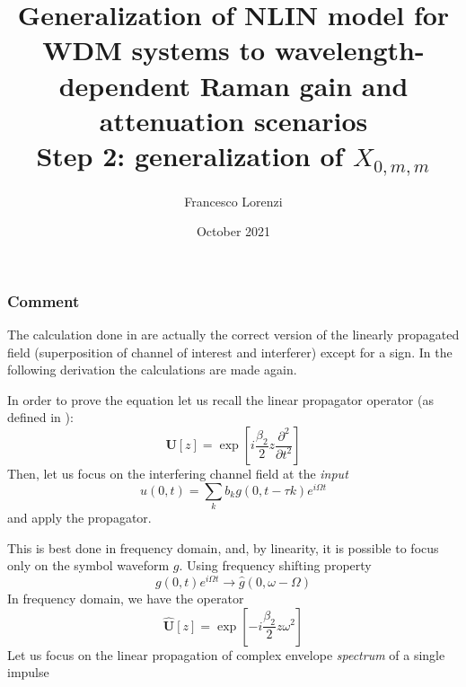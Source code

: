 \documentclass[8pt]{beamer} %
\title{Generalization of NLIN model for WDM systems to wavelength-dependent Raman gain and attenuation scenarios \\ \vspace{10pt} \small{Step 2: generalization of $X_{0, m, m}$}}
\author{Francesco Lorenzi}
\date{October 2021}
\institute[Università degli studi di Padova \\ Dipartimento di ingegneria dell'informazione]{}
\begin{document}
\expandafter\def\expandafter\insertshorttitle\expandafter{%
  \insertshorttitle\hfill%
  \insertframenumber\,/\,\inserttotalframenumber}
\begin{frame}
	\maketitle
\end{frame}

\begin{frame}
	\frametitle{Comment}
    The calculation done in \cite[eq. 1]{Dar_2013} are actually the correct version of the linearly propagated field (superposition of channel of interest and interferer) except for a sign. In the following derivation the calculations are made again.

    In order to prove the equation let us recall the linear propagator operator (as defined in \cite{Dar_2013}):
    \begin{equation}
     \mathbf{U}[z]=\exp \left[i \frac{\beta_{2}}{2} z \frac{\partial^{2}}{\partial t^{2}} \right]
    \end{equation}
    Then, let us focus on the interfering channel field at the \textit{input}
    \begin{equation}
      u(0, t)=\sum_{k} b_{k} g(0, t - \tau k) e^{i \Omega t}
   \end{equation}
   and apply the propagator. 
   
   This is best done in frequency domain, and, by linearity, it is possible to focus only on the symbol waveform $g$. 
   Using frequency shifting property
   \begin{equation}
   	g(0, t) e^{i \Omega t} \rightarrow \hat{g}(0, \omega-\Omega)
   \end{equation} In frequency domain, we have the operator
    \begin{equation}
     \hat{\mathbf{U}}[z]=\exp \left[- i \frac{\beta_{2}}{2} z \omega^2 \right]
    \end{equation}
	Let us focus on the linear propagation of complex envelope \textit{spectrum} of a single impulse

\end{frame}
\end{document}

